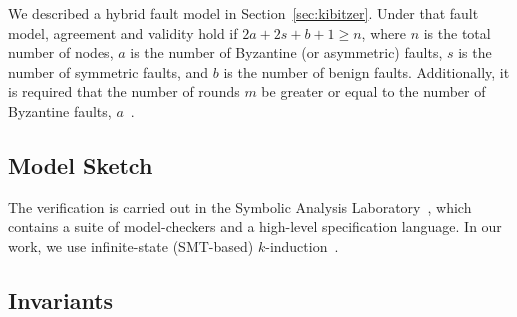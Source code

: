 \documentclass{llncs/llncs}
\newcommand{\lee}[1]{ } %
\newcommand{\lee}[1]{ {\color{blue}$<$lee: #1$>$} } %
\begin{document}
We described a hybrid fault model in Section~\ref{sec:kibitzer}. Under that fault model, agreement and validity hold if $2a+2s+b+1 \geq n$, where $n$ is the total number of nodes, $a$ is the number of Byzantine (or asymmetric) faults, $s$ is the number of symmetric faults, and $b$ is the number of benign faults. Additionally, it is required that the number of rounds $m$ be greater or equal to the number of Byzantine faults, $a$~\cite{csl-93-2,hybrid}.

\subsection{Model Sketch}\label{sec:sketch}
\lee{Ben: can you introduce the relay/receiver unrolling of lieutenants here, since I refer to them later?}
\lee{explain why there are 7 transition systems defined (source, recv, relay, abstractor, abstractorMonitor, clock, observer }

The verification is carried out in the Symbolic Analysis Laboratory~\cite{}, which contains a suite of model-checkers and a high-level specification language. In our work, we use infinite-state (SMT-based) $k$-induction~\cite{}.

\lee{Maybe talk about MJRTY here. Maybe also talk about relaxing in synchronous communication in model.}
\lee{talk about synchrony being loosened, so the general/receivers don't all send/receive at the same time. Talk about lieutenants being ``unrolled'' into relays and receivers, following Rushby.}

\subsection{Invariants}\label{sec:invariants}






\end{document}
